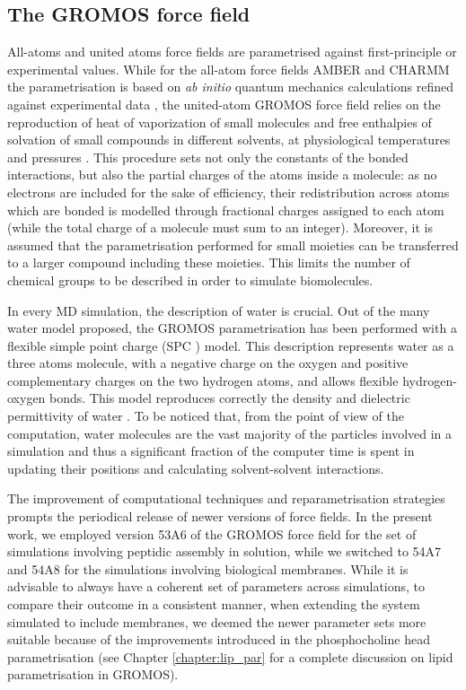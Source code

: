 \subsection{The GROMOS force field}
All-atoms and united atoms force fields are parametrised against first-principle or experimental values.
%
While for the all-atom force fields AMBER and CHARMM the parametrisation is based on \emph{ab initio} quantum mechanics calculations refined against experimental data \citep{Maier2015,Dickson2014,Wang2004_amber,MacKerell1998,Klauda2010}, the united-atom GROMOS force field relies on the reproduction of heat of vaporization of small molecules and free enthalpies of solvation of small compounds in different solvents, at physiological temperatures and pressures \citep{Oostenbrink2005,Schmid2011,Reif2013}.
%
This procedure sets not only the constants of the bonded interactions, but also the partial charges of the atoms inside a molecule: as no electrons are included for the sake of efficiency, their redistribution across atoms which are bonded is modelled through fractional charges assigned to each atom (while the total charge of a molecule must sum to an integer).
%
Moreover, it is assumed that the parametrisation performed for small moieties can be transferred to a larger compound including these moieties. This limits the number of chemical groups to be described in order to simulate biomolecules.

In every MD simulation, the description of water is crucial. Out of the many water model proposed, the GROMOS parametrisation has been performed with a flexible simple point charge (SPC \citep{Berendsen1981}) model. This description represents water as a three atoms molecule, with a negative charge on the oxygen and positive complementary charges on the two hydrogen atoms, and allows flexible hydrogen-oxygen bonds. This model reproduces correctly the density and dielectric permittivity of water \citep{Mark2001}. To be noticed that, from the point of view of the computation, water molecules are the vast majority of the particles involved in a simulation and thus a significant fraction of the computer time is spent in updating their positions and calculating solvent-solvent interactions.

The improvement of computational techniques and reparametrisation strategies prompts the periodical release of newer versions of force fields. In the present work, we employed version 53A6 of the GROMOS force field \citep{Oostenbrink2004} for the set of simulations involving peptidic assembly in solution, while we switched to 54A7 \citep{Schmid2011} and 54A8 \citep{Reif2013} for the simulations involving biological membranes. While it is advisable to always have a coherent set of parameters across simulations, to compare their outcome in a consistent manner, when extending the system simulated to include membranes, we deemed the newer parameter sets more suitable because of the improvements introduced in the phosphocholine head parametrisation \citep{Marzuoli2019} (see Chapter \ref{chapter:lip_par} for a complete discussion on lipid parametrisation in GROMOS).

